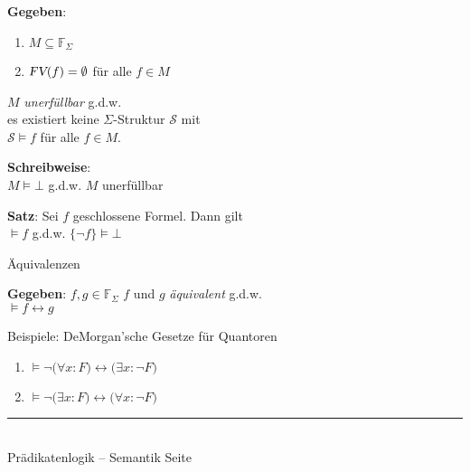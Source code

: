 \documentclass{slides}
\newcommand{\myrule}{\rule{20cm}{1mm}\\ }
\newcommand{\falsum}{\bot}
\newcommand{\FV}{\textsl{FV}}
\newcounter{mypage}
\begin{document}

\begin{slide}{}

\footnotesize
\textbf{Gegeben}:  
\begin{enumerate}
\item $M \subseteq \mathbb{F}_\Sigma$
\item $\FV(f) = \emptyset$ \quad für alle $f \in M$
\end{enumerate}
$M$ \emph{unerfüllbar} \quad g.d.w. \\
es existiert keine $\Sigma$-Struktur $\mathcal{S}$ mit \\[0.3cm]
\hspace*{2.3cm} $\mathcal{S} \models f$ \quad für alle $f \in M$.

\textbf{Schreibweise}: \\[0.1cm]
\hspace*{1.3cm} $M \models \falsum$ \quad g.d.w. $M$ unerfüllbar
\vspace{0.5cm}

\textbf{Satz}: Sei $f$ geschlossene Formel. Dann gilt \\[0.3cm]
\hspace*{1.3cm} 
$\models f$ \quad g.d.w. \quad $\{ \neg f \} \models \falsum$


\normalsize
\begin{center}
Äquivalenzen  
\end{center}
\vspace{0.5cm}
\footnotesize

\textbf{Gegeben}:  $f, g \in \mathbb{F}_\Sigma$
$f$ und $g$ \emph{äquivalent} \quad g.d.w. \\[0.3cm]
\hspace*{3.3cm}  $\models f \leftrightarrow g$

Beispiele: DeMorgan'sche Gesetze für Quantoren
\begin{enumerate}
\item $\models \neg\big(\forall x\colon F\big) \leftrightarrow \big(\exists x\colon \neg F\big)$
\item $\models \neg\big(\exists x\colon F\big) \leftrightarrow \big(\forall x\colon \neg F\big)$
\end{enumerate}


\vspace*{\fill}
\tiny \addtocounter{mypage}{1}
\myrule
Prädikatenlogik -- Semantik  \hspace*{\fill} Seite 
\end{slide}
\end{document}
